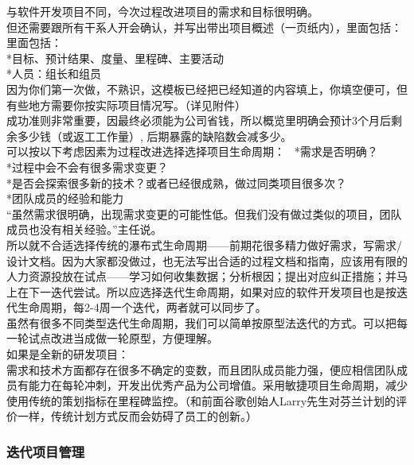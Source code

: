与软件开发项目不同，今次过程改进项目的需求和目标很明确。\\
但还需要跟所有干系人开会确认，并写出带出项目概述（一页纸内），里面包括：\\
里面包括：\\
*目标、预计结果、度量、里程碑、主要活动\\
*人员：组长和组员\\
因为你们第一次做，不熟识，这模板已经把已经知道的内容填上，你填空便可，但有些地方需要你按实际项目情况写。（详见附件）\\
成功准则非常重要，因最终必须能为公司省钱，所以概览里明确会预计3个月后剩余多少钱（或返工工作量）,
后期暴露的缺陷数会减多少。\\
可以按以下考虑因素为过程改进选择选择项目生命周期：\
*需求是否明确？\\
*过程中会不会有很多需求变更？\\
*是否会探索很多新的技术？或者已经很成熟，做过同类项目很多次？\\
*团队成员的经验和能力\\
“虽然需求很明确，出现需求变更的可能性低。但我们没有做过类似的项目，团队成员也没有相关经验。”主任说。\\
所以就不合适选择传统的瀑布式生命周期——前期花很多精力做好需求，写需求/设计文档。因为大家都没做过，也无法写出合适的过程文档和指南，应该用有限的人力资源投放在试点——学习如何收集数据；分析根因；提出对应纠正措施；并马上在下一迭代尝试。所以应选择迭代生命周期，如果对应的软件开发项目也是按迭代生命周期，每2-4周一个迭代，两者就可以同步了。\\


虽然有很多不同类型迭代生命周期，我们可以简单按原型法迭代的方式。可以把每一轮试点改进当成做一轮原型，方便理解。\\

如果是全新的研发项目：\\

需求和技术方面都存在很多不确定的变数，而且团队成员能力强，便应相信团队成员有能力在每轮冲刺，开发出优秀产品为公司增值。采用敏捷项目生命周期，减少使用传统的策划指标在里程碑监控。（和前面谷歌创始人Larry先生对芬兰计划的评价一样，传统计划方式反而会妨碍了员工的创新。）


\hypertarget{ux8fedux4ee3ux9879ux76eeux7ba1ux7406}{%
\subsubsection{迭代项目管理}\label{ux8fedux4ee3ux9879ux76eeux7ba1ux7406}}


